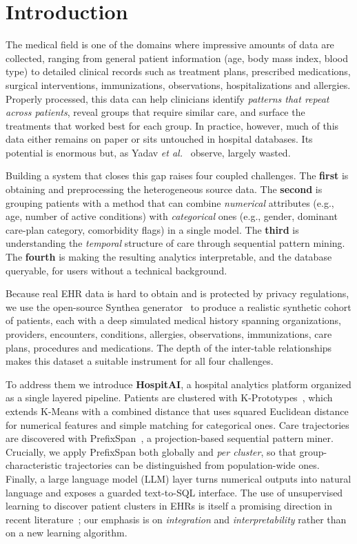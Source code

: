 \section{Introduction}\label{sec:intro}

The medical field is one of the domains where impressive amounts of data are
collected, ranging from general patient information (age, body mass index, blood
type) to detailed clinical records such as treatment plans, prescribed
medications, surgical interventions, immunizations, observations,
hospitalizations and allergies. Properly processed, this data can help
clinicians identify \emph{patterns that repeat across patients}, reveal groups
that require similar care, and surface the treatments that worked best for each
group. In practice, however, much of this data either remains on paper or sits
untouched in hospital databases. Its potential is enormous but, as Yadav
\emph{et al.}~\cite{Yadav2018MiningEHR} observe, largely wasted.

Building a system that closes this gap raises four coupled challenges. The
\textbf{first} is obtaining and preprocessing the heterogeneous source data. The
\textbf{second} is grouping patients with a method that can combine
\emph{numerical} attributes (e.g., age, number of active conditions) with
\emph{categorical} ones (e.g., gender, dominant care-plan category, comorbidity
flags) in a single model. The \textbf{third} is understanding the
\emph{temporal} structure of care through sequential pattern mining. The
\textbf{fourth} is making the resulting analytics interpretable, and the
database queryable, for users without a technical background.

Because real EHR data is hard to obtain and is protected by privacy
regulations, we use the open-source Synthea generator~\cite{Walonoski2018Synthea}
to produce a realistic synthetic cohort of \NPATIENTS{} patients, each with a
deep simulated medical history spanning organizations, providers, encounters,
conditions, allergies, observations, immunizations, care plans, procedures and
medications. The depth of the inter-table relationships makes this dataset a
suitable instrument for all four challenges.

To address them we introduce \textbf{HospitAI}, a hospital analytics platform
organized as a single layered pipeline. Patients are clustered with
K-Prototypes~\cite{Huang1998KPrototypes}, which extends K-Means with a combined
distance that uses squared Euclidean distance for numerical features and simple
matching for categorical ones. Care trajectories are discovered with
PrefixSpan~\cite{Pei2004PrefixSpan}, a projection-based sequential pattern miner.
Crucially, we apply PrefixSpan both globally and \emph{per cluster}, so that
group-characteristic trajectories can be distinguished from population-wide
ones. Finally, a large language model (LLM) layer turns numerical outputs into
natural language and exposes a guarded text-to-SQL interface. The use of
unsupervised learning to discover patient clusters in EHRs is itself a promising
direction in recent literature~\cite{Wang2020UnsupervisedEHR}; our emphasis is
on \emph{integration} and \emph{interpretability} rather than on a new learning
algorithm.

